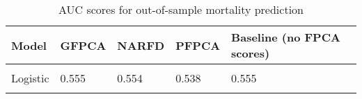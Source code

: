 \begin{table}[th]
    \caption{AUC scores for out-of-sample mortality prediction}
\label{tab:2}
\centering
\begin{tabular}[t]{lllll}
\toprule
Model & GFPCA & NARFD & PFPCA &Baseline (no FPCA scores)\\
\midrule
\cellcolor{gray!6}{AdaBoost} & \cellcolor{gray!6}{0.717} & \cellcolor{gray!6}{0.744} & \cellcolor{gray!6}{0.754}&
\cellcolor{gray!6}{0.729}\\
Logistic & 0.555 & 0.554 & 0.538 &0.555\\
\cellcolor{gray!6}{Random Forest} & \cellcolor{gray!6}{0.724} & \cellcolor{gray!6}{0.703} & \cellcolor{gray!6}{0.722}&
\cellcolor{gray!6}{0.733}\\
\bottomrule
\end{tabular}
\end{table}
